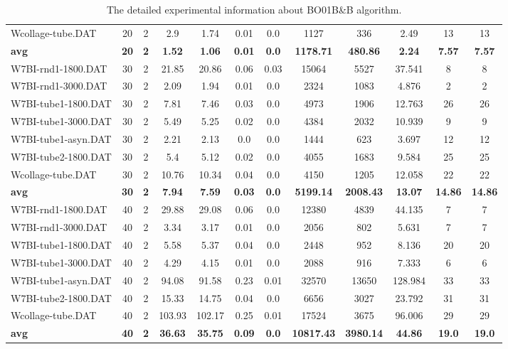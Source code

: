 \begin{table}[!h]
{\begin{tabular}{lccccccccccc}
Wcollage-tube.DAT & 20 & 2 & 2.9 & 1.74 & 0.01 & 0.0 & 1127 & 336 & 2.49 & 13 & 13\\
\cline{1-12} \textbf{avg} & \textbf{20} & \textbf{2} & \textbf{1.52} & \textbf{1.06} & \textbf{0.01} & \textbf{0.0} & \textbf{1178.71} & \textbf{480.86} & \textbf{2.24} & \textbf{7.57} & \textbf{7.57} \\ \cline{1-12}
W7BI-rnd1-1800.DAT & 30 & 2 & 21.85 & 20.86 & 0.06 & 0.03 & 15064 & 5527 & 37.541 & 8 & 8\\
W7BI-rnd1-3000.DAT & 30 & 2 & 2.09 & 1.94 & 0.01 & 0.0 & 2324 & 1083 & 4.876 & 2 & 2\\
W7BI-tube1-1800.DAT & 30 & 2 & 7.81 & 7.46 & 0.03 & 0.0 & 4973 & 1906 & 12.763 & 26 & 26\\
W7BI-tube1-3000.DAT & 30 & 2 & 5.49 & 5.25 & 0.02 & 0.0 & 4384 & 2032 & 10.939 & 9 & 9\\
W7BI-tube1-asyn.DAT & 30 & 2 & 2.21 & 2.13 & 0.0 & 0.0 & 1444 & 623 & 3.697 & 12 & 12\\
W7BI-tube2-1800.DAT & 30 & 2 & 5.4 & 5.12 & 0.02 & 0.0 & 4055 & 1683 & 9.584 & 25 & 25\\
Wcollage-tube.DAT & 30 & 2 & 10.76 & 10.34 & 0.04 & 0.0 & 4150 & 1205 & 12.058 & 22 & 22\\
\cline{1-12} \textbf{avg} & \textbf{30} & \textbf{2} & \textbf{7.94} & \textbf{7.59} & \textbf{0.03} & \textbf{0.0} & \textbf{5199.14} & \textbf{2008.43} & \textbf{13.07} & \textbf{14.86} & \textbf{14.86} \\ \cline{1-12}
W7BI-rnd1-1800.DAT & 40 & 2 & 29.88 & 29.08 & 0.06 & 0.0 & 12380 & 4839 & 44.135 & 7 & 7\\
W7BI-rnd1-3000.DAT & 40 & 2 & 3.34 & 3.17 & 0.01 & 0.0 & 2056 & 802 & 5.631 & 7 & 7\\
W7BI-tube1-1800.DAT & 40 & 2 & 5.58 & 5.37 & 0.04 & 0.0 & 2448 & 952 & 8.136 & 20 & 20\\
W7BI-tube1-3000.DAT & 40 & 2 & 4.29 & 4.15 & 0.01 & 0.0 & 2088 & 916 & 7.333 & 6 & 6\\
W7BI-tube1-asyn.DAT & 40 & 2 & 94.08 & 91.58 & 0.23 & 0.01 & 32570 & 13650 & 128.984 & 33 & 33\\
W7BI-tube2-1800.DAT & 40 & 2 & 15.33 & 14.75 & 0.04 & 0.0 & 6656 & 3027 & 23.792 & 31 & 31\\
Wcollage-tube.DAT & 40 & 2 & 103.93 & 102.17 & 0.25 & 0.01 & 17524 & 3675 & 96.006 & 29 & 29\\
\cline{1-12} \textbf{avg} & \textbf{40} & \textbf{2} & \textbf{36.63} & \textbf{35.75} & \textbf{0.09} & \textbf{0.0} & \textbf{10817.43} & \textbf{3980.14} & \textbf{44.86} & \textbf{19.0} & \textbf{19.0} \\ \cline{1-12}
\bottomrule
\end{tabular}%
}%
\caption{The detailed experimental information about BO01B\&B algorithm.}
\label{tab:table_bb}
\end{table}


